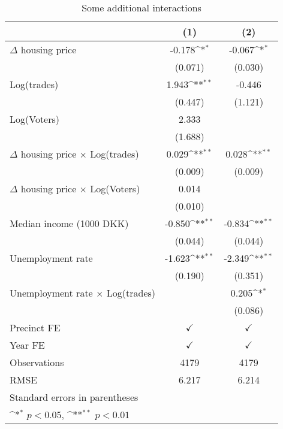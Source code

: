 \begin{table}[htbp]\centering
\def\sym#1{\ifmmode^{#1}\else\(^{#1}\)\fi}
\caption{Some additional interactions} \footnotesize \label{addinter}
\begin{tabular}{l*{2}{c}}
\hline\hline
                    &\multicolumn{1}{c}{(1)}        &\multicolumn{1}{c}{(2)}        \\
\hline
$\Delta$ housing price&      -0.178\sym{*} &      -0.067\sym{*} \\
                    &     (0.071)        &     (0.030)        \\
[1em]
Log(trades)         &       1.943\sym{**}&      -0.446        \\
                    &     (0.447)        &     (1.121)        \\
[1em]
Log(Voters)         &       2.333        &                    \\
                    &     (1.688)        &                    \\
[1em]
$\Delta$ housing price $\times$ Log(trades)&       0.029\sym{**}&       0.028\sym{**}\\
                    &     (0.009)        &     (0.009)        \\
[1em]
$\Delta$ housing price $\times$ Log(Voters)&       0.014        &                    \\
                    &     (0.010)        &                    \\
[1em]
Median income (1000 DKK)&      -0.850\sym{**}&      -0.834\sym{**}\\
                    &     (0.044)        &     (0.044)        \\
[1em]
Unemployment rate   &      -1.623\sym{**}&      -2.349\sym{**}\\
                    &     (0.190)        &     (0.351)        \\
[1em]
Unemployment rate $\times$ Log(trades)&                    &       0.205\sym{*} \\
                    &                    &     (0.086)        \\
[1em]
\hline Precinct FE  &$\checkmark$        &$\checkmark$        \\
[1em]
Year FE             &$\checkmark$        &$\checkmark$        \\
\hline
Observations        &        4179        &        4179        \\
RMSE                &       6.217        &       6.214        \\
\hline\hline
\multicolumn{3}{l}{\footnotesize Standard errors in parentheses}\\
\multicolumn{3}{l}{\footnotesize \sym{*} \(p<0.05\), \sym{**} \(p<0.01\)}\\
\end{tabular}
\end{table}
